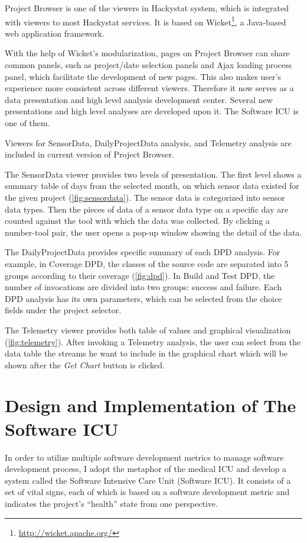 Project Browser is one of the viewers in Hackystat system, which is integrated with viewers to most Hackystat services. It is based on Wicket\footnote{\url{http://wicket.apache.org/}}, a Java-based web application framework.

With the help of Wicket's modularization, pages on Project Browser can share common panels, such as project/date selection panels and Ajax loading process panel, which facilitate the development of new pages. This also makes user's experience more consistent across different viewers. Therefore it now serves as a data presentation and high level analysis development center. Several new presentations and high level analyses are developed upon it. The Software ICU is one of them.

Viewers for SensorData, DailyProjectData analysis, and Telemetry analysis are included in current version of Project Browser.

The SensorData viewer provides two levels of presentation. The first level shows a summary table of days from the selected month, on which sensor data existed for the given project (\autoref{fig:sensordata}). The sensor data is categorized into sensor data types. Then the pieces of data of a sensor data type on a specific day are counted against the tool with which the data was collected. By clicking a number-tool pair, the user opens a pop-up window showing the detail of the data.

The DailyProjectData provides specific summary of each DPD analysis. For example, in Coverage DPD, the classes of the source code are separated into 5 groups according to their coverage (\autoref{fig:dpd}). In Build and Test DPD, the number of invocations are divided into two groups: success and failure. Each DPD analysis has its own parameters, which can be selected from the choice fields under the project selector.

The Telemetry viewer provides both table of values and graphical visualization (\autoref{fig:telemetry}). After invoking a Telemetry analysis, the user can select from the data table the streams he want to include in the graphical chart which will be shown after the {\it Get Chart} button is clicked.



\chapter{Design and Implementation of The Software ICU}
\label{sicu}
In order to utilize multiple software development metrics to manage software development process, I adopt the metaphor of the medical ICU and develop a system called the Software Intensive Care Unit (Software ICU). It consists of a set of vital signs, each of which is based on a software development metric and indicates the project's ``health'' state from one perspective.


